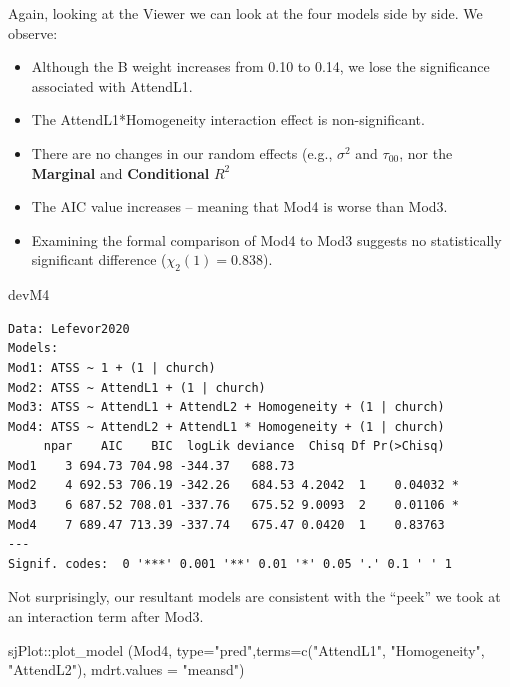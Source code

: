 \documentclass[
  11pt,
]{book}
\newenvironment{Shaded}{\begin{snugshade}}{\end{snugshade}}
\newcommand{\AttributeTok}[1]{\textcolor[rgb]{0.77,0.63,0.00}{#1}}
\newcommand{\FunctionTok}[1]{\textcolor[rgb]{0.00,0.00,0.00}{#1}}
\newcommand{\NormalTok}[1]{#1}
\newcommand{\SpecialCharTok}[1]{\textcolor[rgb]{0.00,0.00,0.00}{#1}}
\newcommand{\StringTok}[1]{\textcolor[rgb]{0.31,0.60,0.02}{#1}}
\providecommand{\tightlist}{%
  \setlength{\itemsep}{0pt}\setlength{\parskip}{0pt}}
\begin{document}
Again, looking at the Viewer we can look at the four models side by side. We observe:

\begin{itemize}
\tightlist
\item
  Although the B weight increases from 0.10 to 0.14, we lose the significance associated with AttendL1.
\item
  The AttendL1*Homogeneity interaction effect is non-significant.
\item
  There are no changes in our random effects (e.g., \(\sigma^{2}\) and \(\tau _{00}\), nor the \textbf{Marginal} and \textbf{Conditional} \(R^2\)
\item
  The AIC value increases -- meaning that Mod4 is worse than Mod3.
\item
  Examining the formal comparison of Mod4 to Mod3 suggests no statistically significant difference (\(\chi_{2}(1) = 0.838\)).
\end{itemize}

\begin{Shaded}
\begin{Highlighting}[]
\NormalTok{devM4}
\end{Highlighting}
\end{Shaded}

\begin{verbatim}
Data: Lefevor2020
Models:
Mod1: ATSS ~ 1 + (1 | church)
Mod2: ATSS ~ AttendL1 + (1 | church)
Mod3: ATSS ~ AttendL1 + AttendL2 + Homogeneity + (1 | church)
Mod4: ATSS ~ AttendL2 + AttendL1 * Homogeneity + (1 | church)
     npar    AIC    BIC  logLik deviance  Chisq Df Pr(>Chisq)  
Mod1    3 694.73 704.98 -344.37   688.73                       
Mod2    4 692.53 706.19 -342.26   684.53 4.2042  1    0.04032 *
Mod3    6 687.52 708.01 -337.76   675.52 9.0093  2    0.01106 *
Mod4    7 689.47 713.39 -337.74   675.47 0.0420  1    0.83763  
---
Signif. codes:  0 '***' 0.001 '**' 0.01 '*' 0.05 '.' 0.1 ' ' 1
\end{verbatim}

Not surprisingly, our resultant models are consistent with the ``peek'' we took at an interaction term after Mod3.

\begin{Shaded}
\begin{Highlighting}[]
\NormalTok{sjPlot}\SpecialCharTok{::}\FunctionTok{plot\_model}\NormalTok{ (Mod4, }\AttributeTok{type=}\StringTok{"pred"}\NormalTok{,}\AttributeTok{terms=}\FunctionTok{c}\NormalTok{(}\StringTok{"AttendL1"}\NormalTok{, }\StringTok{"Homogeneity"}\NormalTok{, }\StringTok{"AttendL2"}\NormalTok{), }\AttributeTok{mdrt.values =} \StringTok{"meansd"}\NormalTok{)}
\end{Highlighting}
\end{Shaded}
\end{document}
